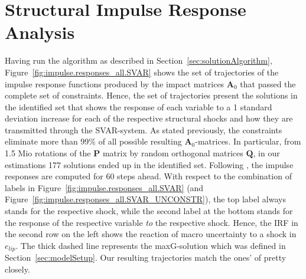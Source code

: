 \documentclass[a4paper,11pt,listof=nochaptergap,oneside,pointednumbers,bibtotoc,bigheadings,liststotoc,hidelinks]{scrbook}
\theoremstyle{mysatz}
\theoremstyle{mydefinition}
\theoremstyle{mytheorem}
\theoremstyle{mybemerkung}
\newcommand{\vect}[1]{\boldsymbol{\mathbf{#1}}}
\begin{document}
\section[Structural Impulse Response Analysis]{Structural Impulse Response Analysis}
\label{sec:ImpulseResponseAnalysis}


Having run the algorithm as described in Section~\ref{sec:solutionAlgorithm}, Figure~\ref{fig:impulse.responses_all.SVAR} shows the set of trajectories of the impulse response functions produced by the impact matrices $\vect{A}_0$ that passed the complete set of constraints. Hence, the set of trajectories present the solutions in the identified set that shows the response of each variable to a 1 standard deviation increase for each of the respective structural shocks and how they are transmitted through the SVAR-system. As stated previously, the constraints eliminate more than 99\% of all possible resulting $\vect{A}_0$-matrices. In particular, from 1.5 Mio rotations of the $\vect{P}$ matrix by random orthogonal matrices $\vect{Q}$, in our estimations 177 solutions ended up in the identified set. Following \citet{ludvigsonetal:19}, the impulse responses are computed for 60 steps ahead. With respect to the combination of labels in Figure~\ref{fig:impulse.responses_all.SVAR} (and Figure~\ref{fig:impulse.responses_all.SVAR_UNCONSTR}), the top label always stands for the respective shock, while the second label at the bottom stands for the response of the respective variable \textit{to} the respective shock. Hence, the IRF in the second row on the left shows the reaction of macro uncertainty to a shock in $e_{lip}$. The thick dashed line represents the maxG-solution which was defined in Section~\ref{sec:modelSetup}. Our resulting trajectories match the ones' of \citet{ludvigsonetal:19} pretty closely. 
\end{document}
